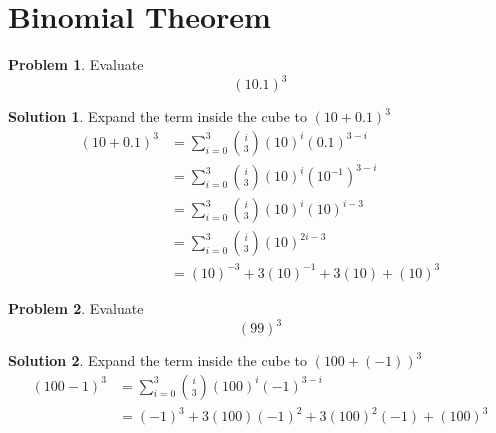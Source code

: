 \documentclass[a4paper]{article}
\theoremstyle{definition}
\newtheorem{problem}{Problem}[section]
\newtheorem*{solution}{Solution}
\begin{document}
\section{Binomial Theorem}
\begin{problem}
Evaluate
\[
(10.1)^3
\]
\end{problem}
\begin{solution}
Expand the term inside the cube to \((10+0.1)^3\)
\begin{align*}
(10+0.1)^3 &= \sum_{i=0}^3 {i \choose 3} (10)^i(0.1)^{3-i} \\
&= \sum_{i=0}^3 {i \choose 3}(10)^i(10^{-1})^{3-i} \\
&= \sum_{i=0}^3 {i \choose 3}(10)^i(10)^{i-3} \\
&= \sum_{i=0}^3 {i \choose 3}(10)^{2i-3} \\
&= (10)^{-3} +3(10)^{-1} + 3(10) + (10)^3
\end{align*}
\end{solution}


\begin{problem}
Evaluate
\[
(99)^3
\]
\end{problem}
\begin{solution}
Expand the term inside the cube to \((100+(-1))^3\)
\begin{align*}
(100-1)^3 &= \sum_{i=0}^3 {i \choose 3} (100)^i(-1)^{3-i} \\
&= (-1)^{3} + 3(100)(-1)^2 + 3(100)^2(-1) + (100)^3
\end{align*}
\end{solution}
\end{document}
